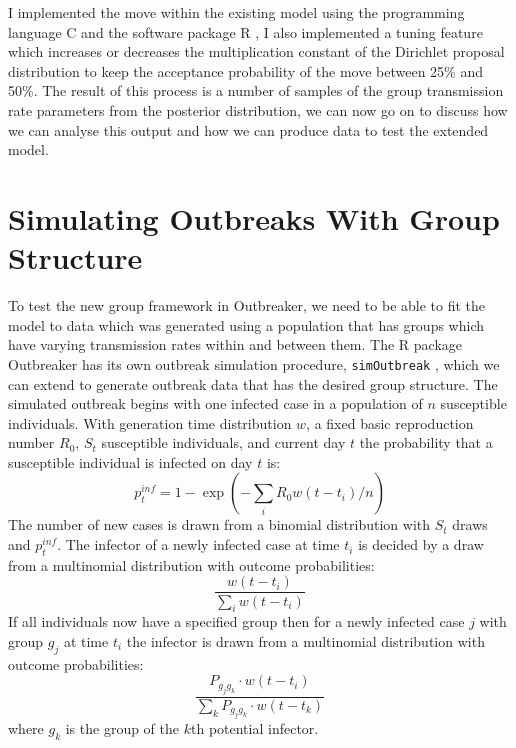 \documentclass[11pt,a4paper]{report}
\begin{document}
I implemented the move within the existing model using the programming language C and the software package R \citep{R14}, I also implemented a tuning feature which increases or decreases the multiplication constant of the Dirichlet proposal distribution to keep the acceptance probability of the move between 25\% and 50\%. The result of this process is a number of samples of the group transmission rate parameters from the posterior distribution, we can now go on to discuss how we can analyse this output and how we can produce data to test the extended model.




\section{Simulating Outbreaks With Group Structure}
To test the new group framework in Outbreaker, we need to be able to fit the model to data which was generated using a population that has groups which have varying transmission rates within and between them. The R package Outbreaker has its own outbreak simulation procedure, {\tt simOutbreak} \citep{outbrkr}, which we can extend to generate outbreak data that has the desired group structure. The simulated outbreak begins with one infected case in a population of $n$ susceptible individuals. With generation time distribution $w$, a fixed basic reproduction number $R_0$, $S_t$ susceptible individuals, and current day $t$ the probability that a susceptible individual is infected on day $t$ is:
\begin{equation}
p^{inf}_t = 1 - \exp{(-\sum_{i} R_{0}w(t-t_i)/n)}
\end{equation}  
The number of new cases is drawn from a binomial distribution with $S_t$ draws and $p^{inf}_t$. The infector of a newly infected case at time $t_i$ is decided by a draw from a multinomial distribution with outcome probabilities: 
\begin{equation}
 \frac{w(t-t_i)}{\sum_i{w(t-t_i)}}
\end{equation}
If all individuals now have a specified group then for a newly infected case $j$ with group $g_j$ at time $t_i$ the infector is drawn from a multinomial distribution with outcome probabilities:
\begin{equation}
 \frac{P_{g_{j}g_{k}} \cdot w(t-t_i)}{\sum_k{P_{g_{j}g_{k}} \cdot w(t-t_k)}}
\end{equation}
where $g_{k}$ is the group of the $k$th potential infector.
\end{document}
